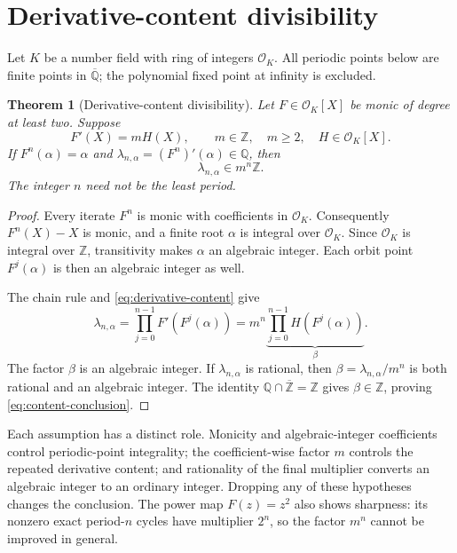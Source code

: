 \documentclass[11pt]{article}
\newtheorem{theorem}{Theorem}[section]
\theoremstyle{remark}
\newcommand{\Qbar}{\overline{\mathbb Q}}
\newcommand{\Zbar}{\overline{\mathbb Z}}
\begin{document}
\section{Derivative-content divisibility}
\label{sec:divisibility}

Let \(K\) be a number field with ring of integers \(\mathcal O_K\).  All
periodic points below are finite points in \(\Qbar\); the polynomial fixed
point at infinity is excluded.

\begin{theorem}[Derivative-content divisibility]
\label{thm:content}
Let \(F\in\mathcal O_K[X]\) be monic of degree at least two.  Suppose
\begin{equation}
 F'(X)=mH(X),\qquad m\in\mathbb Z,\quad m\ge2,
 \quad H\in\mathcal O_K[X].
 \label{eq:derivative-content}
\end{equation}
If \(F^n(\alpha)=\alpha\) and
\(\lambda_{n,\alpha}=(F^n)'(\alpha)\in\mathbb Q\), then
\begin{equation}
 \lambda_{n,\alpha}\in m^n\mathbb Z.
 \label{eq:content-conclusion}
\end{equation}
The integer \(n\) need not be the least period.
\end{theorem}

\begin{proof}
Every iterate \(F^n\) is monic with coefficients in \(\mathcal O_K\).
Consequently \(F^n(X)-X\) is monic, and a finite root \(\alpha\) is integral
over \(\mathcal O_K\).  Since \(\mathcal O_K\) is integral over
\(\mathbb Z\), transitivity makes \(\alpha\) an algebraic integer.  Each
orbit point \(F^j(\alpha)\) is then an algebraic integer as well.

The chain rule and \eqref{eq:derivative-content} give
\begin{equation}
 \lambda_{n,\alpha}
 =\prod_{j=0}^{n-1}F'\!\left(F^j(\alpha)\right)
 =m^n\underbrace{\prod_{j=0}^{n-1}
 H\!\left(F^j(\alpha)\right)}_{\displaystyle\beta}.
 \label{eq:chain-content}
\end{equation}
The factor \(\beta\) is an algebraic integer.  If \(\lambda_{n,\alpha}\) is
rational, then \(\beta=\lambda_{n,\alpha}/m^n\) is both rational and an
algebraic integer.  The identity
\(\mathbb Q\cap\Zbar=\mathbb Z\) gives \(\beta\in\mathbb Z\), proving
\eqref{eq:content-conclusion}.
\end{proof}

Each assumption has a distinct role.  Monicity and algebraic-integer
coefficients control periodic-point integrality; the coefficient-wise factor
\(m\) controls the repeated derivative content; and rationality of the final
multiplier converts an algebraic integer to an ordinary integer.  Dropping
any of these hypotheses changes the conclusion.  The power map \(F(z)=z^2\)
also shows sharpness: its nonzero exact period-\(n\) cycles have multiplier
\(2^n\), so the factor \(m^n\) cannot be improved in general.
\end{document}
